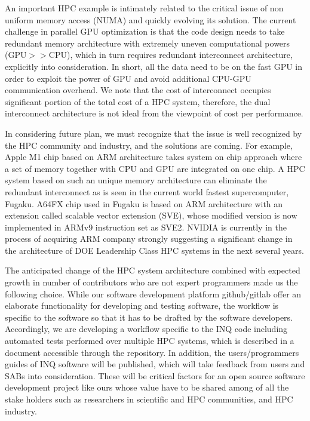 An important HPC example is intimately related to the critical issue of non uniform memory access (NUMA) and quickly evolving its solution. The current challenge in parallel GPU optimization is that the code design needs to take redundant memory architecture with extremely uneven computational powers (GPU$>>$CPU), which in turn requires redundant interconnect architecture, explicitly into consideration. In short, all the data need to be on the fast GPU in order to exploit the power of GPU and avoid additional CPU-GPU communication overhead. We note that the cost of interconnect occupies significant portion of the total cost of a HPC system, therefore, the dual interconnect architecture is not ideal from the viewpoint of cost per performance. 

In considering future plan, we must recognize that the issue is well recognized by the HPC community and industry, and the solutions are coming. For example, Apple M1 chip based on ARM architecture takes system on chip approach where a set of memory together with CPU and GPU are integrated on one chip. A HPC system based on such an unique memory architecture can eliminate the redundant interconnect as is seen in the current world fastest supercomputer, Fugaku. A64FX chip used in Fugaku is based on ARM architecture with an extension called scalable vector extension (SVE), whose modified version is now implemented in ARMv9 instruction set as SVE2. NVIDIA is currently in the process of acquiring ARM company strongly suggesting a significant change in the architecture of DOE Leadership Class HPC systems in the next several years.

 The anticipated change of the HPC system architecture combined with expected growth in number of contributors who are not expert programmers made us the following choice. While our software development platform github/gitlab offer an elaborate functionality for developing and testing software, the workflow is specific to the software so that it has to be drafted by the software developers. Accordingly, we are developing a workflow specific to the INQ code including automated tests performed over multiple HPC systems, which is described in a document accessible through the repository. In addition, the users/programmers guides of INQ software will be published, which will take feedback from users and SABs into consideration. These will be critical factors for an open source software development project like ours whose value have to be shared among of all the stake holders such as researchers in scientific and HPC communities, and HPC industry.
 

